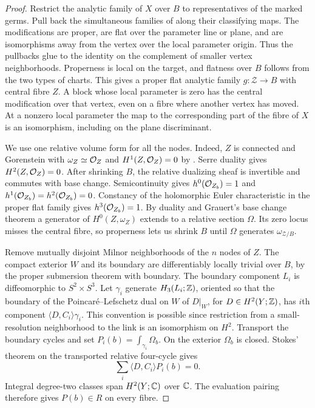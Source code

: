 \begin{proof}
Restrict the analytic family of $X$ over $B$ to representatives of the
marked germs. Pull back the simultaneous families of
\cite[\S3.4 and Proposition~3.8]{W5} along their classifying maps.
The modifications are proper, are flat over the parameter line or
plane, and are isomorphisms away from the vertex over the local
parameter origin. Thus the pullbacks glue to the identity on the
complement of smaller vertex neighborhoods. Properness is local on
the target, and flatness over $B$ follows from the two types of
charts. This gives a proper flat analytic family $g\colon\mathcal Z\to B$
with central fibre $Z$. A block whose local parameter is zero has the
central modification over that vertex, even on a fibre where another
vertex has moved. At a nonzero local parameter the map to the
corresponding part of the fibre of $X$ is an isomorphism, including
on the plane discriminant.

We use one relative volume form for all the nodes. Indeed, $Z$ is
connected and Gorenstein with $\omega_Z\simeq\mathcal O_Z$ and
$H^1(Z,\mathcal O_Z)=0$ by \cite[Proposition~4.1]{W5}. Serre duality
gives $H^2(Z,\mathcal O_Z)=0$. After shrinking $B$, the relative dualizing
sheaf is invertible and commutes with base change. Semicontinuity
gives $h^0(\mathcal O_{Z_b})=1$ and $h^1(\mathcal O_{Z_b})=h^2(\mathcal O_{Z_b})=0$.
Constancy of the holomorphic Euler characteristic in the proper flat
family gives $h^3(\mathcal O_{Z_b})=1$. By duality and Grauert's base change
theorem a generator of $H^0(Z,\omega_Z)$ extends to a relative section
$\Omega$. Its zero locus misses the central fibre, so properness lets
us shrink $B$ until $\Omega$ generates $\omega_{\mathcal Z/B}$.

Remove mutually disjoint Milnor neighborhoods of the $n$ nodes of
$Z$. The compact exterior $W$ and its boundary are differentiably
locally trivial over $B$, by the proper submersion theorem with
boundary. The boundary component $L_i$ is diffeomorphic to
$S^2\times S^3$. Let $\gamma_i$ generate $H_3(L_i;\mathbb Z)$, oriented
so that the boundary of the Poincar\'e--Lefschetz dual on $W$ of
$D|_W$, for $D\in H^2(Y;\mathbb Z)$, has $i$th component
$\langle D,C_i\rangle\gamma_i$. This convention is possible since
restriction from a small-resolution neighborhood to the link is an
isomorphism on $H^2$. Transport the boundary cycles and set
$P_i(b)=\int_{\gamma_i}\Omega_b$. On the exterior $\Omega_b$ is
closed. Stokes' theorem on the transported relative four-cycle gives
\[
              \sum_i\langle D,C_i\rangle P_i(b)=0 .
\]
Integral degree-two classes span $H^2(Y;\mathbb C)$ over $\mathbb C$. The
evaluation pairing therefore gives $P(b)\in R$ on every fibre.


\end{proof}
